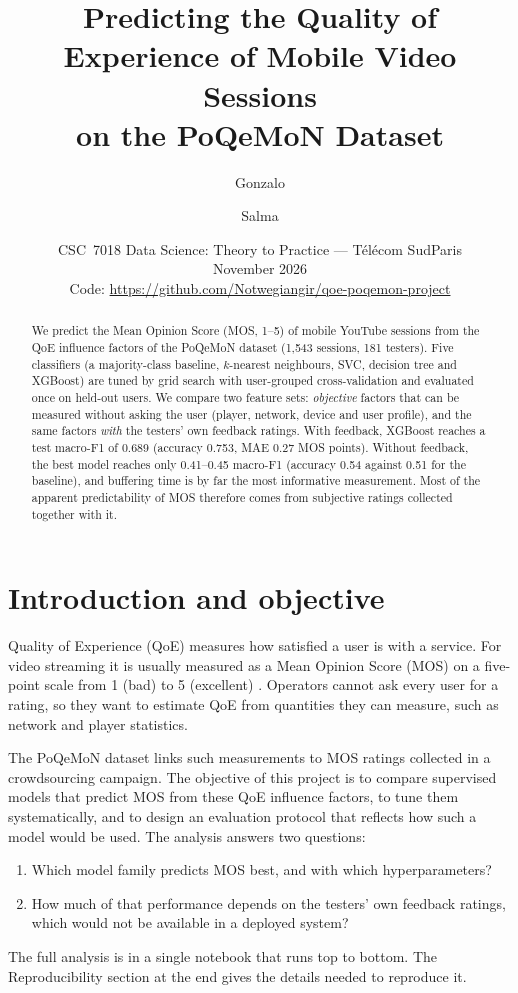 \documentclass[11pt,a4paper]{article}
\title{Predicting the Quality of Experience of Mobile Video Sessions\\
       on the PoQeMoN Dataset}
\author{Gonzalo \todo{surname} \and Salma \todo{surname}}
\date{CSC~7018 Data Science: Theory to Practice --- Télécom SudParis\\[2pt]
      November 2026\\[8pt]
      \small Code: \url{https://github.com/Notwegiangir/qoe-poqemon-project}}
\begin{document}
\hypersetup{pageanchor=false}
\begin{titlepage}
  \maketitle
  \thispagestyle{empty}
  \begin{abstract}
    \noindent We predict the Mean Opinion Score (MOS, 1--5) of mobile YouTube sessions from the
    QoE influence factors of the PoQeMoN dataset (1{,}543 sessions, 181 testers). Five classifiers
    (a majority-class baseline, $k$-nearest neighbours, SVC, decision tree and XGBoost) are tuned by
    grid search with user-grouped cross-validation and evaluated once on held-out users. We compare two
    feature sets: \emph{objective} factors that can be measured without asking the user
    (player, network, device and user profile), and the same factors \emph{with} the testers' own
    feedback ratings. With feedback, XGBoost reaches a test macro-F1 of 0.689 (accuracy 0.753, MAE 0.27 MOS
    points). Without feedback, the best model reaches only 0.41--0.45 macro-F1 (accuracy 0.54 against 0.51
    for the baseline), and buffering time is by far the most informative measurement. Most of the
    apparent predictability of MOS therefore comes from subjective ratings collected together with it.
  \end{abstract}
\end{titlepage}

\hypersetup{pageanchor=true}
\setcounter{page}{1}

\section{Introduction and objective}
Quality of Experience (QoE) measures how satisfied a user is with a service. For video streaming it is
usually measured as a Mean Opinion Score (MOS) on a five-point scale from 1 (bad) to 5 (excellent)
\citep{itu_p800}. Operators cannot ask every user for a rating, so they want to estimate QoE from
quantities they can measure, such as network and player statistics.

The PoQeMoN dataset \citep{amour2015dataset,poqemon_repo} links such measurements to MOS ratings collected
in a crowdsourcing campaign. The objective of this project is to compare supervised models that predict
MOS from these QoE influence factors, to tune them systematically, and to design an evaluation protocol
that reflects how such a model would be used. The analysis answers two questions:
\begin{enumerate}
  \item Which model family predicts MOS best, and with which hyperparameters?
  \item How much of that performance depends on the testers' own feedback ratings, which would not be
        available in a deployed system?
\end{enumerate}
The full analysis is in a single notebook that runs top to bottom. The Reproducibility section at the
end gives the details needed to reproduce it.
\end{document}
